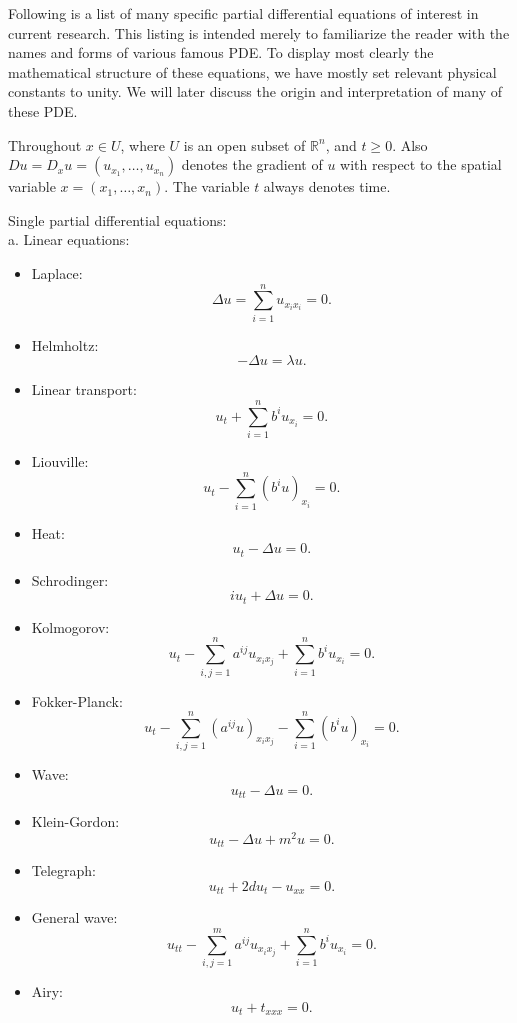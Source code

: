Following is a list of many specific partial differential equations of interest
in current research. This listing is intended merely to familiarize the
reader with the names and forms of various famous PDE. To display most
clearly the mathematical structure of these equations, we have mostly set
relevant physical constants to unity. We will later discuss the origin and
interpretation of many of these PDE.

Throughout $x \in U$, where $U$ is an open subset of $\mathbb{R}^{n}$, and $t \geq 0$. Also $D u=D_{x} u=\left(u_{x_{1}}, \ldots, u_{x_{n}}\right)$ denotes the gradient of $u$ with respect to the spatial variable $x=\left(x_{1}, \ldots, x_{n}\right)$. The variable $t$ always denotes time.

\begin{example} Single partial differential equations:
~\\a. Linear equations:
\begin{itemize}
    \item Laplace: 
    \[
        \Delta u = \sum_{i=1}^n u_{x_ix_i} = 0.  
    \]
    \item Helmholtz:
    \[
        -\Delta u = \lambda u.
    \]
    \item Linear transport:
    \[
        u_t + \sum_{i=1}^n b^i u_{x_i} = 0.    
    \]
    \item Liouville:
    \[
        u_t - \sum_{i=1}^n (b^iu)_{x_i} = 0.    
    \]
    \item Heat: 
    \[
        u_t - \Delta u =0.    
    \]
    \item Schrodinger:
    \[
        iu_t + \Delta u =0.    
    \]
    \item Kolmogorov:
    \[
        u_t  - \sum_{i,j=1}^n a^{ij}u_{x_ix_j} + \sum_{i=1}^n b^i u_{x_i} = 0.    
    \]
    \item Fokker-Planck:
    \[
        u_t  - \sum_{i,j=1}^n (a^{ij}u)_{x_ix_j} - \sum_{i=1}^n (b^i u)_{x_i} = 0.   
    \]
    \item Wave:
    \[
        u_{tt} - \Delta u =0.
    \]
    \item Klein-Gordon:
    \[
        u_{tt} - \Delta u + m^2u = 0.    
    \]
    \item Telegraph:
    \[
        u_{tt} + 2du_t -u_{xx} = 0.
    \]
    \item General wave: 
    \[
      u_{tt} - \sum_{i,j=1}^m a^{ij} u_{x_ix_j} +\sum_{i=1}^n b^i u_{x_i} = 0.  
    \]
    \item Airy:
    \[
        u_t + t_{xxx} = 0.
    \]

\end{itemize}
\end{example}
